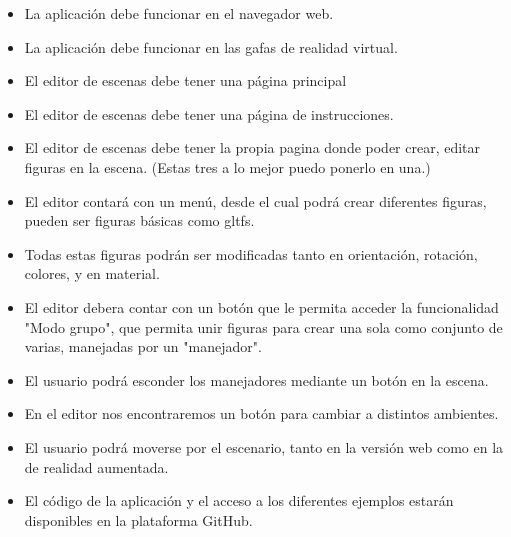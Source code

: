 \documentclass[a4paper, 12pt]{book}
\begin{document}
\begin{itemize}
  \item La aplicación debe funcionar en el navegador web.
  \item La aplicación debe funcionar en las gafas de realidad virtual.
  \item El editor de escenas debe tener una página principal
  \item El editor de escenas debe tener una página de instrucciones.
  \item El editor de escenas debe tener la propia pagina donde poder crear, editar figuras en la escena.
  (Estas tres a lo mejor puedo ponerlo en una.)
  \item El editor contará con un menú, desde el cual podrá crear diferentes figuras, pueden ser figuras básicas como gltfs.
  \item Todas estas figuras podrán ser modificadas tanto en orientación, rotación, colores, y en material.
  \item El editor debera contar con un botón que le permita acceder la funcionalidad "Modo grupo", que permita unir figuras para crear una sola como conjunto de varias, manejadas por un "manejador".
  \item El usuario podrá esconder los manejadores mediante un botón en la escena.  \item En el editor nos encontraremos un botón para cambiar a distintos ambientes.
  \item El usuario podrá moverse por el escenario, tanto en la versión web como en la de realidad aumentada.
  \item El código de la aplicación y el acceso a los diferentes ejemplos estarán disponibles en la plataforma GitHub.
\end{itemize}
\end{document}
